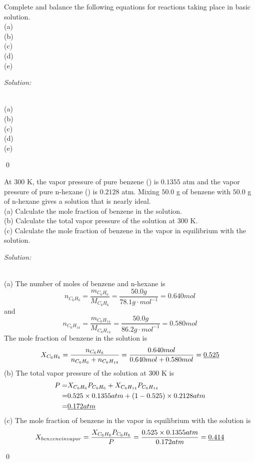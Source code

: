 \documentclass[12pt]{article}
\newenvironment{problem}[2][Problem]{\begin{trivlist}
\item[\hskip \labelsep {\bfseries #1}\hskip \labelsep {\bfseries #2.}]}{\end{trivlist}}
\newenvironment{sol}
    {\emph{Solution:}
    }
    {
    \qed
    }
\begin{document}
\begin{problem}{11.34}
Complete and balance the following equations for reactions taking place in basic solution.\\
(a) \\
(b) \\
(c) \\
(d) \\
(e) 
\end{problem}
\begin{sol}
\\(a) \\
(b) \\
(c) \\
(d) \\
(e) 
\end{sol}

\begin{problem}{11.64}
At $300$ K, the vapor pressure of pure benzene () is $0.1355$ atm and the vapor pressure of pure n-hexane () is $0.2128$ atm. Mixing $50.0$ g of benzene with $50.0$ g of n-hexane gives a solution that is nearly ideal.\\
(a) Calculate the mole fraction of benzene in the solution.\\
(b) Calculate the total vapor pressure of the solution at $300$ K.\\
(c) Calculate the mole fraction of benzene in the vapor in equilibrium with the solution.
\end{problem}
\begin{sol}
\\(a) The number of moles of benzene and n-hexane is
\[
n_{C_6H_6}=\frac{m_{C_6H_6}}{M_{C_6H_6}}=\frac{50.0g}{78.1g\cdot mol^{-1}}=0.640mol
\]
and
\[
n_{C_6H_{14}}=\frac{m_{C_6H_{14}}}{M_{C_6H_{14}}}=\frac{50.0g}{86.2g\cdot mol^{-1}}=0.580mol
\]
The mole fraction of benzene in the solution is
\[
X_{C_6H_6}=\frac{n_{C_6H_6}}{n_{C_6H_6}+n_{C_6H_{14}}}=\frac{0.640mol}{0.640mol+0.580mol}=\uline{0.525}
\]
(b) The total vapor pressure of the solution at $300$ K is
\begin{align*}
P=&X_{C_6H_6}P_{C_6H_6}+X_{C_6H_{14}}P_{C_6H_{14}}\\
=&0.525\times0.1355atm+(1-0.525)\times0.2128atm\\
=&\uline{0.172atm}
\end{align*}
(c) The mole fraction of benzene in the vapor in equilibrium with the solution is
\[
X_{benzene in vapor}=\frac{X_{C_6H_6}P_{C_6H_6}}{P}=\frac{0.525\times0.1355atm}{0.172atm}=\uline{0.414}
\]
\end{sol}
\end{document}
